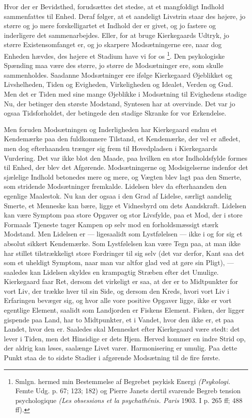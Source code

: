 \documentclass[12pt,a4paper,openany]{book}
\newcommand{\opage}[1]{\marginnote{\footnotesize\textit{[#1]}}}
\begin{document}
Hvor der er Bevidsthed, forudsættes det stedse, at et mangfoldigt Indhold
sammenfattes til Enhed. Deraf følger, at et aandeligt Livstrin staar des
højere, jo større og jo mere forskelligartet et Indhold der er givet, og jo
fastere og inderligere det sammenarbejdes. Eller, for at bruge Kierkegaards
Udtryk, jo større Existensomfanget er, og jo skarpere Modsætningerne ere, naar
dog Enheden hævdes, des højere et Stadium have vi for os%
\footnote[1]{Smlgn. hermed min Bestemmelse af Begrebet psykisk Energi
\textit{(Psykologi.} Femte Udg. p. 67; 123; 182) og Pierre Janets dertil
svarende Begreb tension psychologique \textit{(Les obsessions et la
psychathénis. Paris} 1903. I p. 265 ff; 488 ff).}. Den psykologiske Spænding
maa være des større, jo større de Modsætninger ere, som skulle sammenholdes.
Saadanne Modsætninger ere ifølge Kierkegaard Øjeblikket og Livshelheden, Tiden
og Evigheden, Virkeligheden og Idealet, Verden og Gud. Men det er Tiden med
sine mange Øjeblikke i Modsætning til Evighedens stadige Nu, der betinger den
største Modstand, Syntesen har at overvinde. Det var jo ogsaa Tidsforholdet,
der betingede den stadige Skranke for vor Erkendelse.

Men foruden Modsætningen og Inderligheden har Kierkegaard endnu et Kendemærke
paa den fuldkomnere Tilstand, et Kendemærke, der vel er afledet, men dog
efterhaanden trænger sig frem til Hovedpladsen i Kierkegaards Vurdering. Det
var ikke blot den Maade, paa hvilken en stor Indholdsfylde formes til Enhed,
der blev det Afgørende. Modsætningerne og Modsigelserne indenfor det sjælelige
Indhold betonedes mere og mere, og Vægten blev lagt paa den Smerte, som
stridende Modsætninger fremkalde. Lidelsen blev da
\setcounter{footnote}{0}%
\opage{166}efterhaanden den egenlige Maalestok. Nu kan der ogsaa i den Grad af
Lidelse, særligt aandelig Smerte, et Menneske kan bære, ligge et Vidnesbyrd om
dets Aandskraft. Lidelsen kan være Symptom paa store Opgaver og stor Livsfylde,
paa et Mod, der i store Formaals Tjeneste tager Kampen op selv mod en
forholdsmæssigt stærk Modstand. Men Lidelsen er --- ligesaalidt som
Lystfølelsen --- ikke i og for sig et absolut sikkert Kendemærke. Som
Lystfølelsen kan være Tegn paa, at man ikke har stillet tilstrækkeligt store
Fordringer til sig selv (det var derfor, Kant saa det som et uheldigt Symptom,
naar man var altfor glad ved at gøre sin Pligt), --- saaledes kan Lidelsen
skyldes en krampagtig Stræben efter det Umulige. Kierkegaard faar Ret, dersom
det virkeligt er saa, at der er to Midtpunkter for vort Liv, der trække hver
til sin Side, og dersom den Kreds, hvori vort Liv i Erfaringen bevæger sig, og
hvor alle vore positive Opgaver ligge, ikke er vort egentlige Element, saalidt
som Landjorden er Fiskens Element. Fisken, der ligger gispende paa Land, har to
Midtpunkter, et i Vandet, hvor den ikke er, et paa Landet, hvor den er.
Saaledes skal Mennesket efter Kierkegaard være stedt: det lever i Tiden, men
det Hinsidige er dets Hjem. Herved kommer en indre Strid op, der aldrig kan
løses, saalænge Livet varer. Harmonisering er umulig. Paa dette Punkt staa de
to sidste Stadier i afgørende Modsætning til de fire første.
\end{document}

